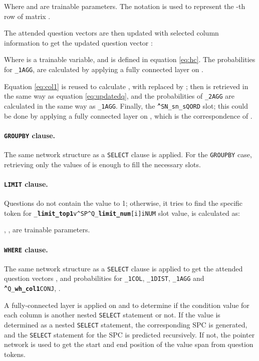\documentclass[11pt,a4paper]{article}
\begin{document}
Where  and  are trainable parameters. The notation  is used to represent the -th row of matrix .

The attended question vectors are then updated with selected column information to get the updated question vector  :



Where  is a trainable variable, and  is defined in equation \ref{eq:hc}. The probabilities for \texttt{\_1AGG}, \texttt{\AGG} are calculated by applying a fully connected layer on .

Equation \ref{eq:col1} is reused to calculate , with  replaced by ; then  is retrieved in the same way as equation \ref{eq:updatedq}, and the probabilities of \texttt{\_2AGG} are calculated in the same way as \texttt{\_1AGG}. Finally, the \texttt{\v^SN_sn_sQORD} slot; this could be done by applying a fully connected layer on , which is the correspondence of .


\paragraph{\texttt{GROUPBY} clause.} The same network structure  as a \texttt{SELECT} clause is applied. For the \texttt{GROUPBY} case, retrieving only the values of  is enough to fill the necessary slots.

\paragraph{\texttt{LIMIT} clause.} Questions do not contain the \texttt{\QNUM} value to 1; otherwise, it tries to find the specific token for \texttt{\QP_{\textbf{limit\_top1}}v^SP^Q_{\textbf{limit\_num}}[i]iNUM} slot value, is calculated as:



, ,  are trainable parameters.

\paragraph{\texttt{WHERE} clause.} The same network structure as a \texttt{SELECT} clause is applied to get the attended question vectors , and probabilities for \texttt{\_1COL}, \texttt{\_1DIST}, \texttt{\_1AGG} and \texttt{\U^Q_\textbf{wh\_col1}CONJ}, \texttt{\COND}.

 A fully-connected layer is applied on  and  to determine if the condition value for each column is another nested \texttt{SELECT} statement or not. If the value is determined as a nested \texttt{SELECT} statement, the corresponding SPC is generated, and the \texttt{SELECT} statement for the SPC is predicted recursively. If not, the pointer network is used to get the start and end position of the value span from question tokens. 
\end{document}

